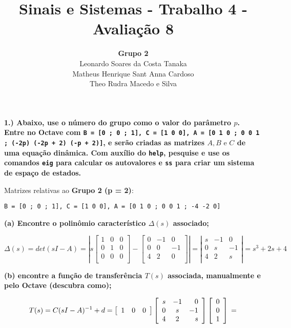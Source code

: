 \documentclass[11pt]{article}
\title{Sinais e Sistemas - Trabalho 4 - Avaliação 8}
\author{
    \textbf{Grupo 2}\\
    Leonardo Soares da Costa Tanaka\\
    Matheus Henrique Sant Anna Cardoso\\
    Theo Rudra Macedo e Silva
}
\date{}
\begin{document}
\maketitle
\thispagestyle{capa}
\newpage

\textbf{1.) Abaixo, use o número do grupo como o valor do parâmetro $p$. Entre no Octave com \texttt{B = [0 ; 0 ; 1], C = [1 0 0], A = [0 1 0 ; 0 0 1 ; (-2p) (-2p + 2) (-p + 2)]}, e serão criadas as matrizes $A, B \text{ e } C$ de uma equação dinâmica. Com auxílio do \texttt{help}, pesquise e use os comandos \texttt{eig} para calcular os autovalores e \texttt{ss} para criar um sistema de espaço de estados.}

Matrizes relativas ao \textbf{Grupo 2 (p = 2)}:

\texttt{B = [0 ; 0 ; 1], C = [1 0 0], A = [0 1 0 ; 0 0 1 ; -4 -2 0]}

\textbf{(a) Encontre o polinômio característico $\Delta(s)$ associado;}

\vspace{\baselineskip}

\[
\Delta(s) = det(sI - A) = \left| s
\left[ {\begin{array}{ccc}
  1 & 0 & 0 \\
  0 & 1 & 0 \\
  0 & 0 & 0 \\
\end{array} } \right]
-
\left[ {\begin{array}{ccc}
    0 & -1 & 0 \\
    0 & 0 & -1 \\
    4 & 2 & 0 \\
  \end{array} } \right]
  \right|
  =
  \left| \begin{array}{rcr}
    s & -1  & 0 \\ 
    0 & s & -1 \\
    4 & 2  & s \\
  \end{array}
  \right|
  = s^3 + 2s + 4
\]

\vspace{\baselineskip}

\textbf{(b) encontre a função de transferência $T(s)$ associada, manualmente e pelo Octave (descubra como);}

\vspace{\baselineskip}

\[
  T(s) = C(sI - A)^{-1} + d =
  \left[ {\begin{array}{ccc}
    1 & 0 & 0 \\
  \end{array} } \right]
  \left[ \begin{array}{rcr}
    s & -1  & 0 \\ 
    0 & s & -1 \\
    4 & 2  & s \\
  \end{array} \right]
  \left[ {\begin{array}{c}
    0 \\
    0 \\
    1 \\
  \end{array} } \right]
  \\
=
\] 
 
\end{document}
